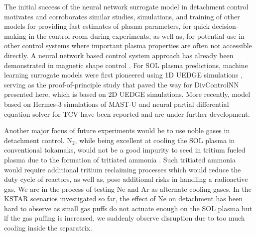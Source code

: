 The initial success of the neural network surrogate model in detachment control motivates and corroborates similar studies, simulations, and training of other models for providing fast estimates of plasma parameters, for quick decision-making in the control room during experiments, as well as, for potential use in other control systems where important plasma properties are often not accessible directly.
A neural network based control system approach has already been demonstrated in magnetic shape control \cite{Degrave_2022_Nature}.
For \ac{SOL} plasma predictions, machine learning surrogate models were first pioneered using 1D UEDGE simulations \cite{Zhu_2022_JPP}, serving as the proof-of-principle study that paved the way for DivControlNN presented here, which is based on 2D UEDGE simulations.
More recently, model based on Hermes-3 \cite{Dudson_2024_CPC} simulations of MAST-U \cite{Holt_2024_NF} and neural partial differential equation solver for TCV \cite{Poels_2023_NF} have been reported and are under further development.

Another major focus of future experiments would be to use noble gases in detachment control.
N$_2$, while being excellent at cooling the SOL plasma in conventional tokamaks, would not be a good impurity to seed in tritium fueled plasma due to the formation of tritiated ammonia \cite{Pitts_2019_NME}.
Such tritiated ammonia would require additional tritium reclaiming processes which would reduce the duty cycle of reactors, as well as, pose additional risks in handling a radioactive gas.
We are in the process of testing Ne and Ar as alternate cooling gases.
In the KSTAR scenarios investigated so far, the effect of Ne on detachment has been hard to observe as small gas puffs do not actuate enough on the \ac{SOL} plasma but if the gas puffing is increased, we suddenly observe disruption due to too much cooling inside the separatrix.
